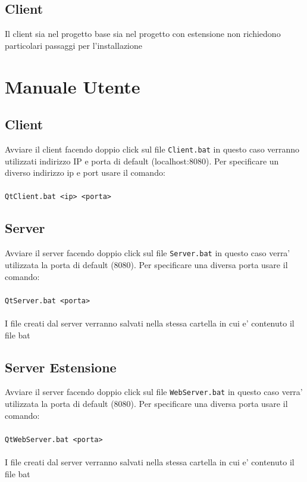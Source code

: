 \documentclass{article}
\begin{document}
        \subsection{Client}
        Il client sia nel progetto base sia nel progetto con estensione non
        richiedono particolari passaggi per l'installazione
    
    \section{Manuale Utente}
        
            \subsection{Client}
            Avviare il client facendo doppio click sul file 
            \verb|Client.bat| in questo caso verranno utilizzati indirizzo
            IP e porta di default (localhost:8080). Per specificare un
            diverso indirizzo ip e port usare il comando: \\\\
            \verb|QtClient.bat <ip> <porta>|

            \subsection{Server}
            Avviare il server facendo doppio click sul file 
            \verb|Server.bat| in questo caso verra' utilizzata la porta di
            default (8080). Per specificare una diversa porta 
            usare il comando: \\\\
            \verb|QtServer.bat <porta>|\\\\
            I file creati dal server verranno salvati nella stessa cartella
            in cui e' contenuto il file bat
            
            \subsection{Server Estensione}
            Avviare il server facendo doppio click sul file 
            \verb|WebServer.bat| in questo caso verra' utilizzata la porta di
            default (8080). Per specificare una diversa porta 
            usare il comando: \\\\
            \verb|QtWebServer.bat <porta>|\\\\
            I file creati dal server verranno salvati nella stessa cartella
            in cui e' contenuto il file bat
            
\end{document}
